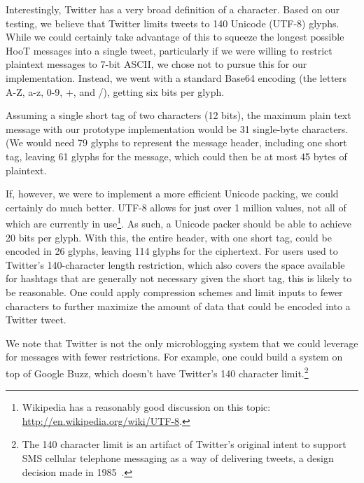 Interestingly, Twitter has a very broad definition of a character. Based
on our testing, we believe that Twitter limits tweets to 140 Unicode
(UTF-8) glyphs. While we could certainly take advantage of this to
squeeze the longest possible HooT messages into a single tweet,
particularly if we were willing to restrict \hoot plaintext messages to
7-bit ASCII, we chose not to pursue this for our
implementation. Instead, we went with a standard Base64 encoding (the
letters A-Z, a-z, 0-9, +, and /), getting six bits per glyph.

Assuming a single short tag of two characters (12 bits), the maximum
plain text message with our prototype implementation would be 31
single-byte characters. (We would need 79 glyphs to represent the
message header, including one short tag, leaving 61 glyphs for the
message, which could then be at most 45 bytes of plaintext.

If, however, we were to implement a more efficient Unicode packing, we
could certainly do much better. UTF-8 allows for just over 1 million
values, not all of which are currently in use\footnote{Wikipedia has a
  reasonably good discussion on this topic:
  \url{http://en.wikipedia.org/wiki/UTF-8}.}. As such, a Unicode packer
should be able to achieve 20 bits per glyph. With this, the entire \hoot
header, with one short tag, could be encoded in 26 glyphs, leaving 114
glyphs for the ciphertext. For users used to Twitter's 140-character
length restriction, which also covers the space available for hashtags
that are generally not necessary given the short tag, this is likely to
be reasonable. One could apply compression schemes and limit inputs to
fewer characters to further maximize the amount of data that could be
encoded into a Twitter tweet.

We note that Twitter is not the only microblogging system that we could
leverage for \hoot messages with fewer restrictions. For example, one
could build a \hoot system on top of Google Buzz, which doesn't have
Twitter's 140 character limit.\footnote{The 140 character limit is an
  artifact of Twitter's original intent to support SMS cellular
  telephone messaging as a way of delivering tweets, a design decision
  made in 1985~\cite{latimes-char160}.}

